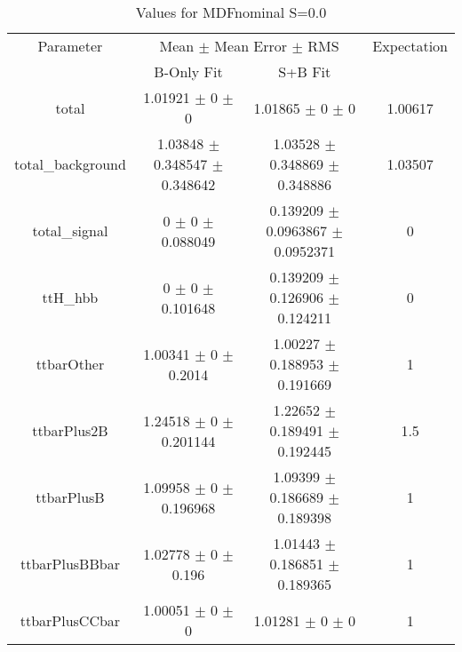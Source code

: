 \begin{table}
\centering
\caption{Values for MDFnominal S=0.0}
\begin{tabular}{cccc}
\toprule
Parameter & \multicolumn{2}{c}{Mean $\pm$ Mean Error $\pm$ RMS} & Expectation\\
 & B-Only Fit & S+B Fit & \\
\midrule
total & \num{1.01921} $\pm$ \num{0} $\pm$ \num{0} & \num{1.01865} $\pm$ \num{0} $\pm$ \num{0} & \num{1.00617}\\
total\_background & \num{1.03848} $\pm$ \num{0.348547} $\pm$ \num{0.348642} & \num{1.03528} $\pm$ \num{0.348869} $\pm$ \num{0.348886} & \num{1.03507}\\
total\_signal & \num{0} $\pm$ \num{0} $\pm$ \num{0.088049} & \num{0.139209} $\pm$ \num{0.0963867} $\pm$ \num{0.0952371} & \num{0}\\
ttH\_hbb & \num{0} $\pm$ \num{0} $\pm$ \num{0.101648} & \num{0.139209} $\pm$ \num{0.126906} $\pm$ \num{0.124211} & \num{0}\\
ttbarOther & \num{1.00341} $\pm$ \num{0} $\pm$ \num{0.2014} & \num{1.00227} $\pm$ \num{0.188953} $\pm$ \num{0.191669} & \num{1}\\
ttbarPlus2B & \num{1.24518} $\pm$ \num{0} $\pm$ \num{0.201144} & \num{1.22652} $\pm$ \num{0.189491} $\pm$ \num{0.192445} & \num{1.5}\\
ttbarPlusB & \num{1.09958} $\pm$ \num{0} $\pm$ \num{0.196968} & \num{1.09399} $\pm$ \num{0.186689} $\pm$ \num{0.189398} & \num{1}\\
ttbarPlusBBbar & \num{1.02778} $\pm$ \num{0} $\pm$ \num{0.196} & \num{1.01443} $\pm$ \num{0.186851} $\pm$ \num{0.189365} & \num{1}\\
ttbarPlusCCbar & \num{1.00051} $\pm$ \num{0} $\pm$ \num{0} & \num{1.01281} $\pm$ \num{0} $\pm$ \num{0} & \num{1}\\
\bottomrule
\end{tabular}
\end{table}